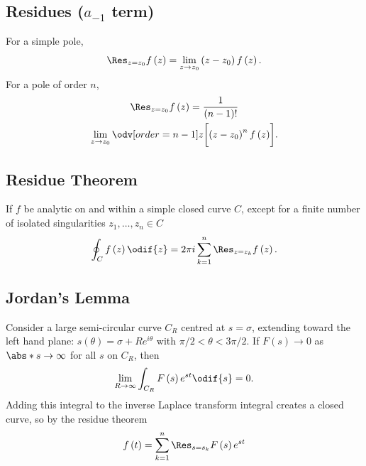 \documentclass{article}
\begin{document}
\begin{multicols*}{3}
    \subsection{Residues (\texorpdfstring{\(a_{-1}\)}{a-1} term)}
    For a simple pole,
    \begin{equation*}
        \Res_{z = z_0} f\left( z \right) = \lim_{z \to z_0} \left( z - z_0 \right) f\left( z \right).
    \end{equation*}
    For a pole of order \(n\),
    \begin{multline*}
        \Res_{z = z_0} f\left( z \right) = \frac{1}{\left( n - 1 \right)!} \\
        \lim_{z \to z_0} \odv[order={n - 1}]{}{z} \biggl[ \left( z - z_0 \right)^n f\left( z \right) \biggr].
    \end{multline*}
    \subsection{Residue Theorem}
    If \(f\) be analytic on and within a simple closed curve \(C\),
    except for a finite number of isolated singularities \(z_1, \ldots, z_n \in C\)
    \begin{equation*}
        \oint_C f\left( z \right) \odif{z} = 2 \pi i \sum_{k = 1}^n \Res_{z = z_k} f\left( z \right).
    \end{equation*}
    \subsection{Jordan's Lemma}
    Consider a large semi-circular curve \(C_R\) centred at \(s = \sigma\), extending toward the left hand plane:
    \(s\left( \theta \right) = \sigma + R e^{i \theta}\) with \(\pi/2 < \theta < 3\pi/2\).
    If \(F\left( s \right) \to 0\) as \(\abs*{s} \to \infty\) for all \(s\) on \(C_R\),
    then
    \begin{equation*}
        \lim_{R \to \infty} \int_{C_R} F\left( s \right) e^{s t} \odif{s} = 0.
    \end{equation*}
    Adding this integral to the inverse Laplace transform integral
    creates a closed curve, so by the residue theorem
    \begin{equation*}
        f\left( t \right) = \sum_{k = 1}^n \Res_{s = s_k} F\left( s \right) e^{s t}
    \end{equation*}

\end{multicols*}
\end{document}
